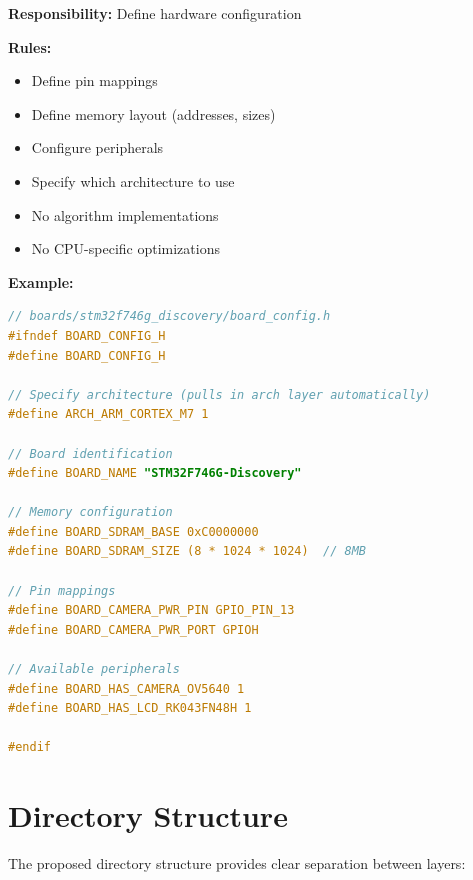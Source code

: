 \documentclass[11pt,a4paper]{article}
\begin{document}
\textbf{Responsibility:} Define hardware configuration

\textbf{Rules:}
\begin{itemize}
    \item[✓] Define pin mappings
    \item[✓] Define memory layout (addresses, sizes)
    \item[✓] Configure peripherals
    \item[✓] Specify which architecture to use
    \item[✗] No algorithm implementations
    \item[✗] No CPU-specific optimizations
\end{itemize}

\textbf{Example:}
\begin{lstlisting}[language=C,caption={STM32F746G-Discovery configuration (board layer)}]
// boards/stm32f746g_discovery/board_config.h
#ifndef BOARD_CONFIG_H
#define BOARD_CONFIG_H

// Specify architecture (pulls in arch layer automatically)
#define ARCH_ARM_CORTEX_M7 1

// Board identification
#define BOARD_NAME "STM32F746G-Discovery"

// Memory configuration
#define BOARD_SDRAM_BASE 0xC0000000
#define BOARD_SDRAM_SIZE (8 * 1024 * 1024)  // 8MB

// Pin mappings
#define BOARD_CAMERA_PWR_PIN GPIO_PIN_13
#define BOARD_CAMERA_PWR_PORT GPIOH

// Available peripherals
#define BOARD_HAS_CAMERA_OV5640 1
#define BOARD_HAS_LCD_RK043FN48H 1

#endif
\end{lstlisting}

\section{Directory Structure}

The proposed directory structure provides clear separation between layers:
\end{document}
